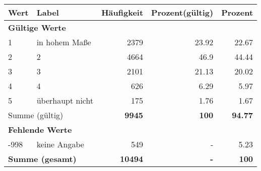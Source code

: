     \begin{longtable}{lXrrr}
     \toprule
     \textbf{Wert} & \textbf{Label} & \textbf{Häufigkeit} & \textbf{Prozent(gültig)} & \textbf{Prozent} \\
     \endhead
     \midrule
     \multicolumn{5}{l}{\textbf{Gültige Werte}}\\

     1 &
     \multicolumn{1}{X}{ in hohem Maße   } &


       \num{2379} &
       \num[round-mode=places,round-precision=2]{23.92} &
         \num[round-mode=places,round-precision=2]{22.67} \\

     2 &
     \multicolumn{1}{X}{ 2   } &


       \num{4664} &
       \num[round-mode=places,round-precision=2]{46.9} &
         \num[round-mode=places,round-precision=2]{44.44} \\

     3 &
     \multicolumn{1}{X}{ 3   } &


       \num{2101} &
       \num[round-mode=places,round-precision=2]{21.13} &
         \num[round-mode=places,round-precision=2]{20.02} \\

     4 &
     \multicolumn{1}{X}{ 4   } &


       \num{626} &
       \num[round-mode=places,round-precision=2]{6.29} &
         \num[round-mode=places,round-precision=2]{5.97} \\

     5 &
     \multicolumn{1}{X}{ überhaupt nicht   } &


       \num{175} &
       \num[round-mode=places,round-precision=2]{1.76} &
         \num[round-mode=places,round-precision=2]{1.67} \\
     \midrule
     \multicolumn{2}{l}{Summe (gültig)} &
       \textbf{\num{9945}} &
     \textbf{\num{100}} &
       \textbf{\num[round-mode=places,round-precision=2]{94.77}} \\
     \multicolumn{5}{l}{\textbf{Fehlende Werte}}\\
       -998 &
       keine Angabe &
         \num{549} &
        - &
         \num[round-mode=places,round-precision=2]{5.23} \\
     \midrule
     \multicolumn{2}{l}{\textbf{Summe (gesamt)}} &
          \textbf{\num{10494}} &
        \textbf{-} &
        \textbf{\num{100}} \\
     \bottomrule
     \end{longtable}
     
